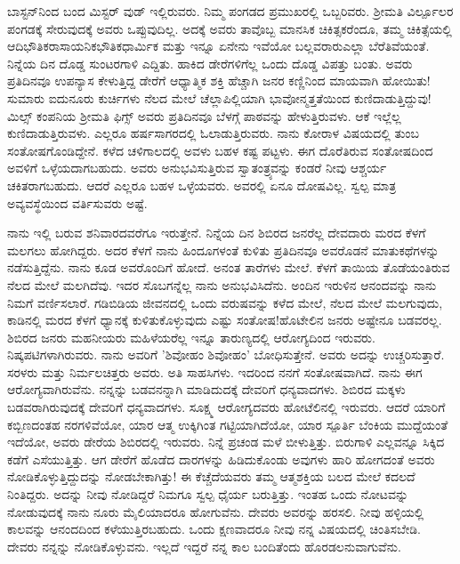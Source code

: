 ಬಾಸ್ಟನ್‌ನಿಂದ ಬಂದ ಮಿಸ್ಟರ್ ವುಡ್ ಇಲ್ಲಿರುವರು. ನಿಮ್ಮ ಪಂಗಡದ ಪ್ರಮುಖರಲ್ಲಿ ಒಬ್ಬರಿವರು. ಶ‍್ರೀಮತಿ ವಿ‌ರ್ಲ್ಪೂಲರ ಪಂಗಡಕ್ಕೆ ಸೇರುವುದಕ್ಕೆ ಅವರು ಒಪ್ಪುವುದಿಲ್ಲ. ಅದಕ್ಕೆ ಅವರು ತಾವೊಬ್ಬ ಮಾನಸಿಕ ಚಿಕಿತ್ಸಕರೆಂದೂ, ತಮ್ಮ ಚಿಕಿತ್ಸೆಯಲ್ಲಿ \enginline{-}ಆದಿಭೌತಿಕ\enginline{-}ರಾಸಾಯನಿಕ\enginline{-}ಭೌತಿಕ\enginline{-}ಧಾರ್ಮಿಕ ಮತ್ತು ಇನ್ನೂ ಏನೇನು ಇವೆಯೋ ಬಲ್ಲವರಾರು\enginline{-}ಎಲ್ಲಾ ಬೆರೆತಿವೆಯಂತೆ. ನಿನ್ನೆಯ ದಿನ ದೊಡ್ಡ ಸುಂಟರಗಾಳಿ ಎದ್ದಿತು. ಹಾಕಿದ ಡೇರೆಗಳಿಗೆಲ್ಲ ಒಂದು ದೊಡ್ಡ ವಿಪತ್ತು ಬಂತು. ಅವರು ಪ್ರತಿದಿನವೂ ಉಪನ್ಯಾಸ ಕೇಳುತ್ತಿದ್ದ ಡೇರೆಗೆ ಆಧ್ಯಾತ್ಮಿಕ ಶಕ್ತಿ ಹೆಚ್ಚಾಗಿ ಜನರ ಕಣ್ಣಿನಿಂದ ಮಾಯವಾಗಿ ಹೋಯಿತು! ಸುಮಾರು ಐದುನೂರು ಕುರ್ಚಿಗಳು ನೆಲದ ಮೇಲೆ ಚೆಲ್ಲಾಪಿಲ್ಲಿಯಾಗಿ ಭಾವೋನ್ಮತ್ತತೆಯಿಂದ ಕುಣಿದಾಡು\break ತ್ತಿದ್ದುವು! ಮಿಲ್ಸ್ ಕಂಪನಿಯ ಶ‍್ರೀಮತಿ ಫಿಗ್ಸ್ ಅವರು ಪ್ರತಿದಿನವೂ ಬೆಳಗ್ಗೆ ಪಾಠವನ್ನು ಹೇಳುತ್ತಿರುವಳು. ಆಕೆ ಇಲ್ಲೆಲ್ಲ ಕುಣಿದಾಡುತ್ತಿರುವಳು. ಎಲ್ಲರೂ ಹರ್ಷಸಾಗರದಲ್ಲಿ ಓಲಾಡುತ್ತಿರುವರು. ನಾನು ಕೋರಾಳ ವಿಷಯದಲ್ಲಿ ತುಂಬ ಸಂತೋಷಗೊಂಡಿದ್ದೇನೆ. ಕಳೆದ ಚಳಿಗಾಲದಲ್ಲಿ ಅವಳು ಬಹಳ ಕಷ್ಟ ಪಟ್ಟಳು. ಈಗ ದೊರೆತಿರುವ ಸಂತೋಷದಿಂದ ಅವಳಿಗೆ ಒಳ್ಳೆಯದಾಗಬಹುದು. ಅವರು ಅನುಭವಿಸುತ್ತಿರುವ ಸ್ವಾತಂತ್ರ್ಯವನ್ನು ಕಂಡರೆ ನೀವು ಆಶ್ಚರ್ಯ ಚಕಿತರಾಗಬಹುದು. ಆದರೆ ಎಲ್ಲರೂ ಬಹಳ ಒಳ್ಳೆಯವರು. ಅವರಲ್ಲಿ ಏನೂ ದೋಷವಿಲ್ಲ. ಸ್ವಲ್ಪ ಮಾತ್ರ ಅವ್ಯವಸ್ಥೆಯಿಂದ ವರ್ತಿಸುವರು ಅಷ್ಟೆ.

ನಾನು ಇಲ್ಲಿ ಬರುವ ಶನಿವಾರದವರೆಗೂ ಇರುತ್ತೇನೆ. ನಿನ್ನೆಯ ದಿನ ಶಿಬಿರದ ಜನರೆಲ್ಲ ದೇವದಾರು ಮರದ ಕೆಳಗೆ ಮಲಗಲು ಹೋಗಿದ್ದರು. ಅದರ ಕೆಳಗೆ ನಾನು ಹಿಂದೂಗಳಂತೆ ಕುಳಿತು ಪ್ರತಿದಿನವೂ ಅವರೊಡನೆ ಮಾತುಕಥೆಗಳನ್ನು ನಡೆಸುತ್ತಿದ್ದೆನು. ನಾನು ಕೂಡ ಅವರೊಂದಿಗೆ ಹೋದೆ. ಅನಂತ ತಾರೆಗಳು ಮೇಲೆ. ಕೆಳಗೆ ತಾಯಿಯ ತೊಡೆಯಂತಿರುವ ನೆಲದ ಮೇಲೆ ಮಲಗಿದೆವು. ಇದರ ಸೊಬಗನ್ನೆಲ್ಲ ನಾನು ಅನುಭವಿಸಿದೆನು. ಅಂದಿನ ಇರುಳಿನ ಆನಂದವನ್ನು ನಾನು ನಿಮಗೆ ವರ್ಣಿಸಲಾರೆ. ಗಡಿಬಿಡಿಯ ಜೀವನದಲ್ಲಿ ಒಂದು ವರುಷವನ್ನು ಕಳೆದ ಮೇಲೆ, ನೆಲದ ಮೇಲೆ ಮಲಗುವುದು, ಕಾಡಿನಲ್ಲಿ ಮರದ ಕೆಳಗೆ ಧ್ಯಾನಕ್ಕೆ ಕುಳಿತುಕೊಳ್ಳುವುದು ಎಷ್ಟು ಸಂತೋಷ!ಹೊಟೇಲಿನ ಜನರು ಅಷ್ಟೇನೂ ಬಡವರಲ್ಲ. ಶಿಬಿರದ ಜನರು \enginline{-} ಮಹನೀಯರು ಮಹಿಳೆಯರೆಲ್ಲ ಇನ್ನೂ ತಾರುಣ್ಯದಲ್ಲಿ ಆರೋಗ್ಯದಿಂದ ಇರುವರು. ನಿಷ್ಕಪಟಿಗಳಾಗಿರುವರು. ನಾನು ಅವರಿಗೆ 'ಶಿವೋಹಂ ಶಿವೋಹಂ' ಬೋಧಿಸುತ್ತೇನೆ. ಅವರು ಅದನ್ನು ಉಚ್ಚರಿಸುತ್ತಾರೆ. ಸರಳರು ಮತ್ತು ನಿರ್ಮಲಚಿತ್ತರು ಅವರು. ಅತಿ ಸಾಹಸಿಗಳು. ಇದರಿಂದ ನನಗೆ ಸಂತೋಷವಾಗಿದೆ. ನಾನು ಈಗ ಆರೋಗ್ಯವಾಗಿರುವೆನು. ನನ್ನನ್ನು ಬಡವನನ್ನಾಗಿ ಮಾಡಿದುದಕ್ಕೆ ದೇವರಿಗೆ ಧನ್ಯವಾದಗಳು. ಶಿಬಿರದ ಮಕ್ಕಳು ಬಡವರಾಗಿರುವುದಕ್ಕೆ ದೇವರಿಗೆ ಧನ್ಯವಾದಗಳು. ಸೂಕ್ಷ್ಮ ಆರೋಗ್ಯದವರು ಹೋಟೆಲಿನಲ್ಲಿ ಇರುವರು. ಆದರೆ ಯಾರಿಗೆ ಕಬ್ಬಿಣದಂತಹ ನರಗಳಿವೆಯೋ, ಯಾರ ಆತ್ಮ ಉಕ್ಕಿಗಿಂತ ಗಟ್ಟಿಯಾಗಿದೆಯೋ, ಯಾರ ಸ್ಪೂರ್ತಿ ಬೆಂಕಿಯ ಮುದ್ದೆಯಂತೆ ಇದೆಯೋ, ಅವರು ಡೇರೆಯ ಶಿಬಿರದಲ್ಲಿ ಇರುವರು. ನಿನ್ನೆ ಪ್ರಚಂಡ ಮಳೆ ಬೀಳುತ್ತಿತ್ತು. ಬಿರುಗಾಳಿ ಎಲ್ಲವನ್ನೂ ಸಿಕ್ಕಿದ ಕಡೆಗೆ ಎಸೆಯುತ್ತಿತ್ತು. ಆಗ ಡೇರೆಗೆ ಹೊಡೆದ ದಾರಗಳನ್ನು ಹಿಡಿದುಕೊಂಡು ಅವುಗಳು ಹಾರಿ ಹೋಗದಂತೆ ಅವರು ನೋಡಿಕೊಳ್ಳುತ್ತಿದ್ದುದನ್ನು ನೋಡಬೇಕಾಗಿತ್ತು! ಈ ಕೆಚ್ಚೆದೆಯವರು ತಮ್ಮ ಆತ್ಮಶಕ್ತಿಯ ಬಲದ ಮೇಲೆ ಕದಲದೆ ನಿಂತಿದ್ದರು. ಅದನ್ನು ನೀವು ನೋಡಿದ್ದರೆ ನಿಮಗೂ ಸ್ವಲ್ಪ ಧೈರ್ಯ ಬರುತ್ತಿತ್ತು. ಇಂತಹ ಒಂದು ನೋಟವನ್ನು ನೋಡುವುದಕ್ಕೆ ನಾನು ನೂರು ಮೈಲಿಯಾದರೂ ಹೋಗುವೆನು. ದೇವರು ಅವರನ್ನು ಹರಸಲಿ. ನೀವು ಹಳ್ಳಿಯಲ್ಲಿ ಕಾಲವನ್ನು ಆನಂದದಿಂದ ಕಳೆಯುತ್ತಿರಬಹುದು. ಒಂದು ಕ್ಷಣವಾದರೂ ನೀವು ನನ್ನ ವಿಷಯದಲ್ಲಿ ಚಿಂತಿಸಬೇಡಿ. ದೇವರು ನನ್ನನ್ನು ನೋಡಿಕೊಳ್ಳುವನು. ಇಲ್ಲದೆ ಇದ್ದರೆ ನನ್ನ ಕಾಲ ಬಂದಿತೆಂದು ಹೊರಡಲನುವಾಗುವೆನು.

